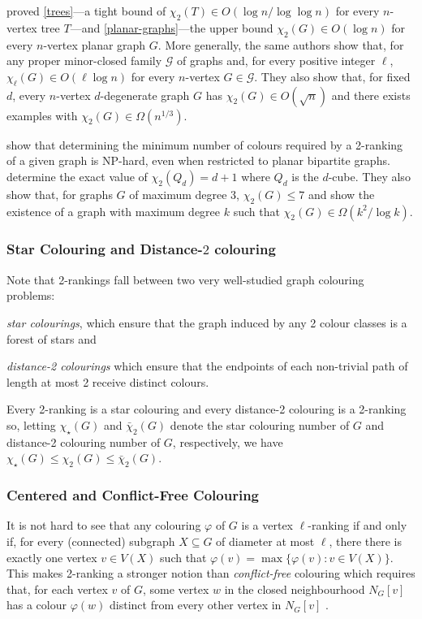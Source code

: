 \documentclass[kpfonts]{patmorin}
\newcommand{\trn}{\chi_2}
\newcommand{\dtcn}{\bar{\chi}_2}
\newcommand{\scn}{\chi_{\star}}
\theoremstyle{named}
\begin{document}
\citet{karpas.neiman.ea:on} proved \cref{trees}---a tight bound of $\trn(T)\in O(\log n/\log\log n)$ for every $n$-vertex tree $T$---and \cref{planar-graphs}---the upper bound $\trn(G)\in O(\log n)$ for every $n$-vertex planar graph $G$.  More generally, the same authors show that, for any proper minor-closed family $\mathcal{G}$ of graphs and, for every positive integer $\ell$, $\chi_\ell(G)\in O(\ell\log n)$ for every $n$-vertex $G\in\mathcal{G}$.  They also show that, for fixed $d$, every $n$-vertex $d$-degenerate graph $G$ has $\trn(G)\in O(\sqrt{n})$ and there exists examples with $\trn(G)\in\Omega(n^{1/3})$.

\citet{shalu.antony:complexity} show that determining the minimum number of colours required by a 2-ranking of a given graph is NP-hard, even when restricted to planar bipartite graphs.  \citet{almeter.demircan.ea:graph} determine the exact value of $\trn(Q_d)=d+1$ where $Q_d$ is the $d$-cube.  They also show that, for graphs $G$ of maximum degree 3, $\trn(G)\le 7$ and show the existence of a graph with maximum degree $k$ such that $\trn(G)\in\Omega(k^2/\log k)$.


\subsubsection{Star Colouring and Distance-$2$ colouring}

 Note that 2-rankings fall between two very well-studied graph colouring problems:
\begin{compactitem}
    \item \emph{star colourings}, which ensure that the graph induced by any 2 colour classes is a forest of stars and
    \item \emph{distance-2 colourings} which ensure that the endpoints of each non-trivial path of length at most 2 receive distinct colours.
\end{compactitem}
Every 2-ranking is a star colouring and every distance-2 colouring is a 2-ranking so, letting $\scn(G)$ and $\dtcn(G)$ denote the star colouring number of $G$ and distance-2 colouring number of $G$, respectively, we have $\scn(G) \le \trn(G)\le \dtcn(G)$.


\subsubsection{Centered and Conflict-Free Colouring}

It is not hard to see that any colouring $\varphi$ of $G$ is a vertex $\ell$-ranking if and only if, for every (connected) subgraph $X\subseteq G$ of diameter at most $\ell$, there there is exactly one vertex $v\in V(X)$ such that $\varphi(v)=\max\{\varphi(v):v\in V(X)\}$. This makes 2-ranking a stronger notion than \emph{conflict-free} colouring which requires that, for each vertex $v$ of $G$, some vertex $w$ in the closed neighbourhood $N_G[v]$ has a colour $\varphi(w)$ distinct from every other vertex in $N_G[v]$ \cite{pach.tardos:conflict-free,glebov.szabo.ea:conflict-free,gargano.rescigno:complexity}.
\end{document}
